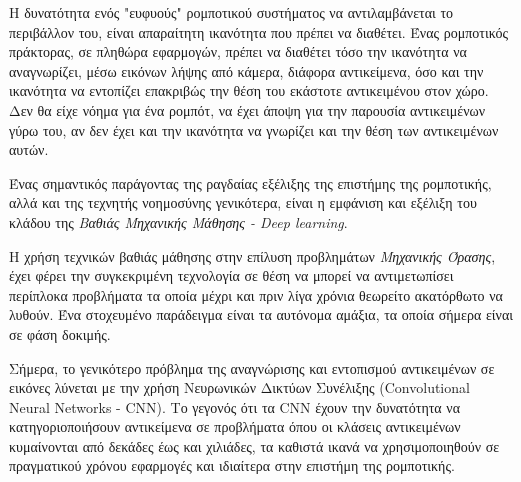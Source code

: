 Η δυνατότητα ενός "ευφυούς" ρομποτικού συστήματος να αντιλαμβάνεται
το περιβάλλον του, είναι απαραίτητη ικανότητα που πρέπει να διαθέτει.
Ένας ρομποτικός πράκτορας, σε πληθώρα εφαρμογών, πρέπει να διαθέτει τόσο την
ικανότητα να αναγνωρίζει, μέσω εικόνων λήψης από κάμερα, διάφορα αντικείμενα,
όσο και την ικανότητα να εντοπίζει επακριβώς την θέση του
εκάστοτε αντικειμένου στον χώρο. Δεν θα είχε νόημα για ένα ρομπότ, να έχει άποψη
για την παρουσία αντικειμένων γύρω του, αν δεν έχει και την ικανότητα να γνωρίζει
και την θέση των αντικειμένων αυτών. %

Ένας σημαντικός παράγοντας της ραγδαίας εξέλιξης της επιστήμης της ρομποτικής, αλλά
και της τεχνητής νοημοσύνης γενικότερα, είναι η εμφάνιση και εξέλιξη του κλάδου
της \emph{Βαθιάς Μηχανικής Μάθησης - Deep learning}.

Η χρήση τεχνικών βαθιάς μάθησης στην επίλυση προβλημάτων \emph{Μηχανικής Όρασης},
έχει φέρει την συγκεκριμένη τεχνολογία σε θέση να μπορεί να αντιμετωπίσει
περίπλοκα προβλήματα τα οποία μέχρι και πριν λίγα χρόνια θεωρείτο ακατόρθωτο να λυθούν.
Ένα στοχευμένο παράδειγμα είναι τα αυτόνομα αμάξια, τα οποία σήμερα είναι σε
φάση δοκιμής.

Σήμερα, το γενικότερο πρόβλημα της αναγνώρισης και εντοπισμού αντικειμένων σε εικόνες
λύνεται με την χρήση Νευρωνικών Δικτύων Συνέλιξης (Convolutional Neural Networks - CNN).
Το γεγονός ότι τα CNN έχουν την δυνατότητα να κατηγοριοποιήσουν αντικείμενα
σε προβλήματα όπου οι κλάσεις αντικειμένων κυμαίνονται από δεκάδες έως και χιλιάδες,
τα καθιστά ικανά να χρησιμοποιηθούν σε πραγματικού χρόνου εφαρμογές
και ιδιαίτερα στην επιστήμη της ρομποτικής.




